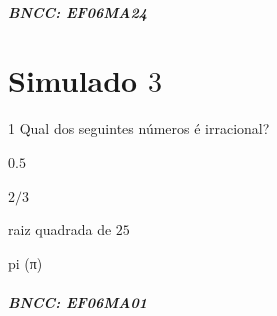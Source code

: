 {\paragraph{BNCC: EF06MA24 }


\chapter{Simulado $3$}

\num{1}  Qual dos seguintes números é irracional?

\begin{escolha}
\item $0.5$
\item $2/3$
\item raiz quadrada de $25$
\item pi (π)
\end{escolha}

\paragraph{BNCC: EF06MA01 }


}
